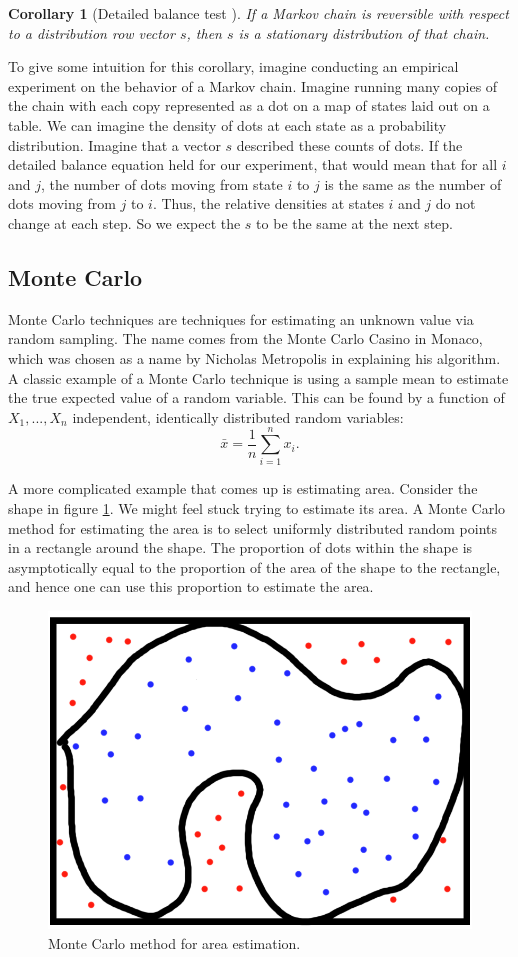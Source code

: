 \documentclass[11pt]{amsart}
\theoremstyle{theorem} %
\newtheorem{cor}[thm]{Corollary}
\theoremstyle{definition}                  %
\theoremstyle{example}                       %
\theoremstyle{remark}                       %
\numberwithin{equation}{section}
\begin{document}
\begin{cor}[{Detailed balance test \cite[p.~82]{pierre}}]
    If a Markov chain is reversible with respect to a distribution row vector $s$, then $s$ is a stationary distribution of that chain.
\end{cor}

To give some intuition for this corollary, imagine conducting an empirical experiment on the behavior of a Markov chain. Imagine running many copies of the chain with each copy represented as a dot on a map of states laid out on a table. We can imagine the density of dots at each state as a probability distribution. Imagine that a vector $s$ described these counts of dots. If the detailed balance equation held for our experiment, that would mean that for all $i$ and $j$, the number of dots moving from state $i$ to $j$ is the same as the number of dots moving from $j$ to $i$. Thus, the relative densities at states $i$ and $j$ do not change at each step. So we expect the $s$ to be the same at the next step.

\subsection{Monte Carlo}

Monte Carlo techniques are techniques for estimating an unknown value via random sampling. The name comes from the Monte Carlo Casino in Monaco, which was chosen as a name by Nicholas Metropolis in explaining his algorithm. A classic example of a Monte Carlo technique is using a sample mean to estimate the true expected value of a random variable. This can be found by a function of $X_1, ..., X_n$ independent, identically distributed random variables:
\[\bar{x} = \frac{1}{n}\sum_{i=1}^n x_i.\]

A more complicated example that comes up is estimating area. Consider the shape in figure \ref{fig:mcarea}. We might feel stuck trying to estimate its area. A Monte Carlo method for estimating the area is to select uniformly distributed random points in a rectangle around the shape. The proportion of dots within the shape is asymptotically equal to the proportion of the area of the shape to the rectangle, and hence one can use this proportion to estimate the area.

\begin{figure}[h]
    \centering
    \includegraphics[width = .5\textwidth]{montecarloex.png}
    \caption{Monte Carlo method for area estimation.}
    \label{fig:mcarea}
\end{figure}
\end{document}
